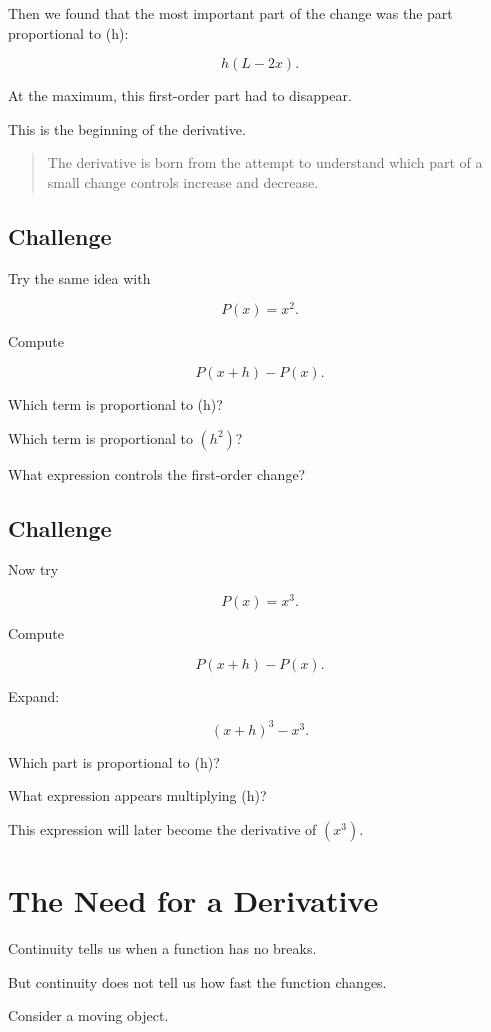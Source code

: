 Then we found that the most important part of the change was the part proportional to (h):

\[
h(L-2x).
\]

At the maximum, this first-order part had to disappear.

This is the beginning of the derivative.

\begin{quote}
The derivative is born from the attempt to understand which part of a small change controls increase and decrease.
\end{quote}

\subsection{Challenge}

Try the same idea with

\[
P(x)=x^2.
\]

Compute

\[
P(x+h)-P(x).
\]

Which term is proportional to (h)?

Which term is proportional to $(h^2)$?

What expression controls the first-order change?

\subsection{Challenge}

Now try

\[
P(x)=x^3.
\]

Compute

\[
P(x+h)-P(x).
\]

Expand:

\[
(x+h)^3-x^3.
\]

Which part is proportional to (h)?

What expression appears multiplying (h)?

This expression will later become the derivative of $(x^3)$.


\section{The Need for a Derivative}

Continuity tells us when a function has no breaks.

But continuity does not tell us how fast the function changes.

Consider a moving object.

